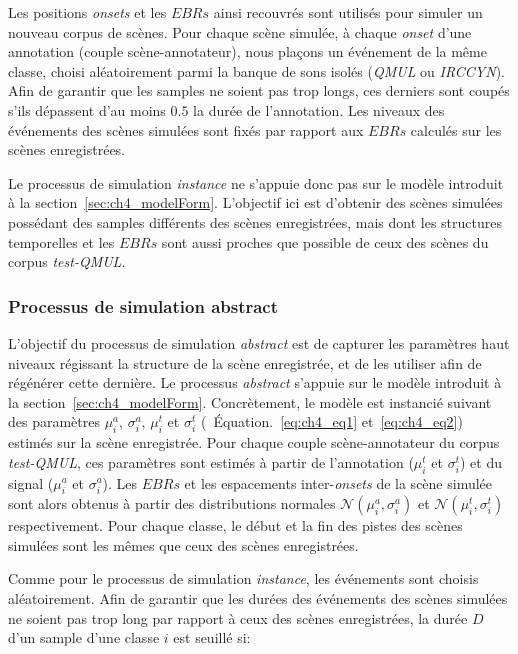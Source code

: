 Les positions \emph{onsets} et les $EBRs$ ainsi recouvrés sont utilisés pour simuler un nouveau corpus de scènes. Pour chaque scène simulée, à chaque \emph{onset} d'une annotation (couple scène-annotateur), nous plaçons un événement de la même classe, choisi aléatoirement parmi la banque de sons isolés (\emph{QMUL} ou \emph{IRCCYN}). Afin de garantir que les samples ne soient pas trop longs, ces derniers sont coupés s'ils dépassent d'au moins $0.5$ la durée de l'annotation. Les niveaux des événements des scènes simulées sont fixés par rapport aux $EBRs$ calculés sur les scènes enregistrées. 

Le processus de simulation \emph{instance} ne s'appuie donc pas sur le modèle introduit à la section~\ref{sec:ch4_modelForm}. L'objectif ici est d’obtenir des scènes simulées possédant des samples différents des scènes enregistrées, mais dont les structures temporelles et les $EBRs$ sont aussi proches que possible de ceux des scènes du corpus \emph{test-QMUL}.

\subsubsection{Processus de simulation abstract}
\label{sec:ch7_simuProcessAbstract}

L'objectif du processus de simulation \emph{abstract} est de capturer les paramètres haut niveaux régissant la structure de la scène enregistrée, et de les utiliser afin de régénérer cette dernière. Le processus \emph{abstract} s'appuie sur le modèle introduit à la section~\ref{sec:ch4_modelForm}. Concrètement, le modèle est instancié suivant des paramètres $\mu_i^a$, $\sigma_i^a$, $\mu_i^t$ et $\sigma_i^t$ (\cf~Équation.~\ref{eq:ch4_eq1} et~\ref{eq:ch4_eq2}) estimés sur la scène enregistrée. Pour chaque couple scène-annotateur du corpus  \emph{test-QMUL}, ces paramètres sont estimés à partir de l'annotation ($\mu_i^t$ et $\sigma_i^t$) et du signal ($\mu_i^a$ et $\sigma_i^a$). Les $EBRs$ et les espacements inter-\emph{onsets} de la scène simulée sont alors obtenus à partir des distributions normales $\mathcal{N}(\mu_i^a,\sigma_i^a)$ et $\mathcal{N}(\mu_i^t,\sigma_i^t)$ respectivement. Pour chaque classe, le début et la fin des pistes des scènes simulées sont les mêmes que ceux des scènes enregistrées.

Comme pour le processus de simulation \emph{instance}, les événements sont choisis aléatoirement. Afin de garantir que les durées des événements des scènes simulées ne soient pas trop long par rapport à ceux des scènes enregistrées, la durée $D$ d'un sample d'une classe $i$ est seuillé si:

